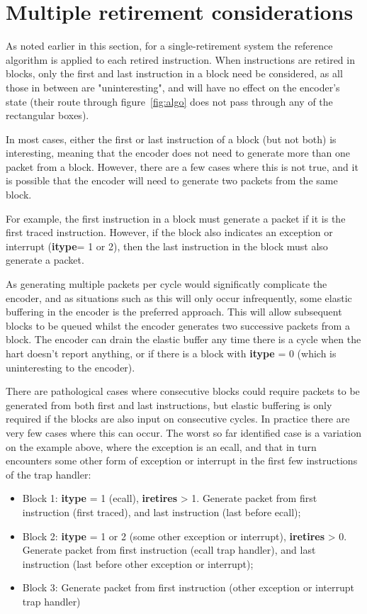 \section{Multiple retirement considerations} \label{rec:multiretcon}

As noted earlier in this section, for a single-retirement system the reference algorithm is applied to each retired
instruction.  When instructions are retired in blocks, only the first and last instruction in a block need be
considered, as all those in between are "uninteresting", and will have no effect on the encoder's state (their route
through figure~\ref{fig:algo} does not pass through any of the rectangular boxes).

In most cases, either the first or last instruction of a block (but not both) is interesting, meaning that the 
encoder does not need to generate more than one packet from a block.  However, there are a few cases where this
is not true, and it is possible that the encoder will need to generate two packets from the same block.  

For example, the first instruction in a block must generate a packet if it is the first traced instruction.  However,
if the block also indicates an exception or interrupt (\textbf{itype}= 1 or 2), then the last instruction in the block 
must also generate a packet.

As generating multiple packets per cycle would significatly complicate the encoder, and as situations such as this
will only occur infrequently, some elastic buffering in the encoder is the preferred approach.  This will allow subsequent
blocks to be queued whilst the encoder generates two successive packets from a block.  The encoder can drain the 
elastic buffer any time there is a cycle when the hart doesn't report anything, or if there is a block with 
\textbf{itype} = 0 (which is uninteresting to the encoder).

There are pathological cases where consecutive blocks could require packets to be generated from both first and last
instructions, but elastic buffering is only required if the blocks are also input on consecutive cycles.  In practice
there are very few cases where this can occur.  The worst so far identified case is a variation on the example above, 
where the exception is an ecall, and that in turn encounters some other form of exception or interrupt in the first 
few instructions of the trap handler:

\begin{itemize}
  \item Block 1: \textbf{itype} = 1 (ecall), \textbf{iretires} > 1.  Generate packet from first instruction (first traced),
    and last instruction (last before ecall);
  \item Block 2: \textbf{itype} = 1 or 2 (some other exception or interrupt), \textbf{iretires} > 0.  
    Generate packet from first instruction (ecall trap handler), and last instruction (last before other exception or interrupt);
  \item Block 3: Generate packet from first instruction (other exception or interrupt trap handler)
\end{itemize}

